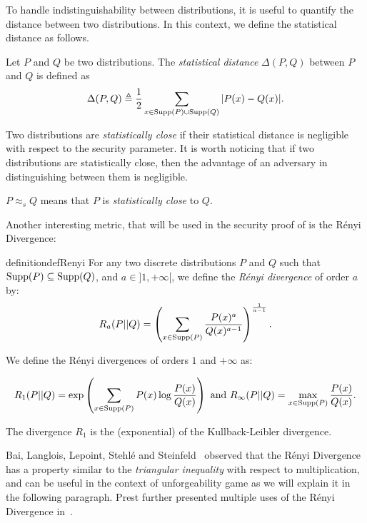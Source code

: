 To handle indistinguishability between distributions, it is useful to quantify the distance between two distributions.
In this context, we define the statistical distance as follows.

\begin{definition} 
  Let $P$ and $Q$ be two distributions. The \textit{statistical distance} $\Delta(P, Q)$ between $P$ and $Q$ is defined as
  \[ \Delta(P, Q) \triangleq \frac{1}{2} \sum_{x \in \mathrm{Supp}(P) \cup \mathrm{Supp}(Q)} | P(x) - Q(x)|. \]
\end{definition}

Two distributions are \textit{statistically close} if their statistical distance is negligible with respect to the security parameter.
It is worth noticing that if two distributions are statistically close, then the advantage of an adversary in distinguishing between them is negligible.

 $P \approx_s Q$ means that $P$ is \textit{statistically close} to $Q$.

Another interesting metric, that will be used in the security proof of %
is the Rényi Divergence:

\begin{restatable}{definition}{defRenyi}
  \label{def:renyi} 
  For any two discrete distributions $P$ and $Q$ such that $\mathrm{Supp}(P) \subseteq
  \mathrm{Supp}(Q)$, and $a \in ]1, +\infty[$, we define the \emph{R\'enyi divergence} of order $a$ by:
    \[ R_a(P||Q) = \left( \sum_{x \in \mathrm{Supp}(P)} \frac{P(x)^a}{Q(x)^{a-1}} \right)^{\frac{1}{a-1}}. \]

    We define the R\'enyi divergences of orders $1$ and $+\infty$ as:

    \[ R_1(P||Q) = \exp\left( \sum_{x \in \mathrm{Supp}(P)} P(x) \log \frac{P(x)}{Q(x)} \right) \mbox{ and } R_\infty (P||Q) = \max_{x \in \mathrm{Supp}(P)} \frac{P(x)}{Q(x)}. \]

    The divergence $R_1$ is the (exponential) of the Kullback-Leibler divergence.
\end{restatable}

Bai, Langlois, Lepoint, Stehlé and Steinfeld~\cite{BLL+15} observed that the Rényi Divergence has a property similar to the \textit{triangular inequality} with respect to multiplication, and can be useful in the context of unforgeability game as we will explain it in the following paragraph. Prest further presented multiple uses of the Rényi Divergence in~\cite{Pre17}.

